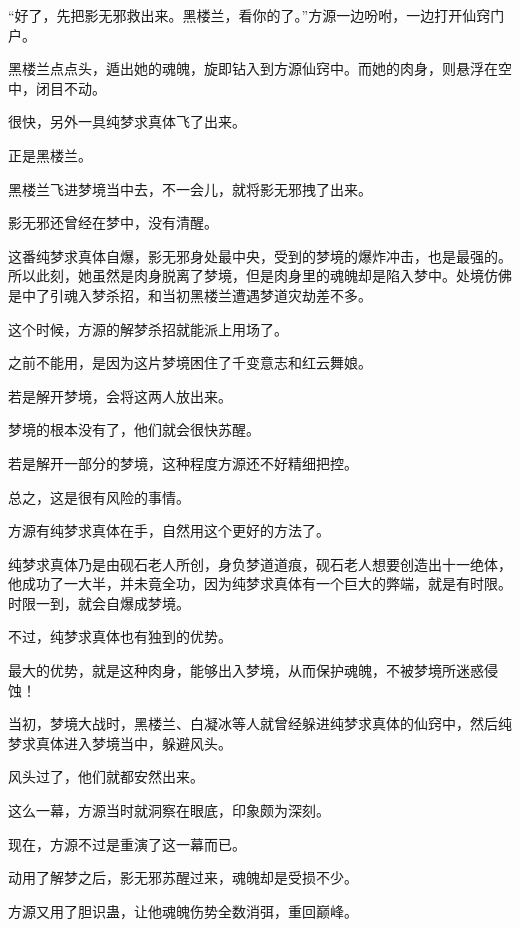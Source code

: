 
\begin{this_body}



“好了，先把影无邪救出来。黑楼兰，看你的了。”方源一边吩咐，一边打开仙窍门户。

黑楼兰点点头，遁出她的魂魄，旋即钻入到方源仙窍中。而她的肉身，则悬浮在空中，闭目不动。

很快，另外一具纯梦求真体飞了出来。

正是黑楼兰。

黑楼兰飞进梦境当中去，不一会儿，就将影无邪拽了出来。

影无邪还曾经在梦中，没有清醒。

这番纯梦求真体自爆，影无邪身处最中央，受到的梦境的爆炸冲击，也是最强的。所以此刻，她虽然是肉身脱离了梦境，但是肉身里的魂魄却是陷入梦中。处境仿佛是中了引魂入梦杀招，和当初黑楼兰遭遇梦道灾劫差不多。

这个时候，方源的解梦杀招就能派上用场了。

之前不能用，是因为这片梦境困住了千变意志和红云舞娘。

若是解开梦境，会将这两人放出来。

梦境的根本没有了，他们就会很快苏醒。

若是解开一部分的梦境，这种程度方源还不好精细把控。

总之，这是很有风险的事情。

方源有纯梦求真体在手，自然用这个更好的方法了。

纯梦求真体乃是由砚石老人所创，身负梦道道痕，砚石老人想要创造出十一绝体，他成功了一大半，并未竟全功，因为纯梦求真体有一个巨大的弊端，就是有时限。时限一到，就会自爆成梦境。

不过，纯梦求真体也有独到的优势。

最大的优势，就是这种肉身，能够出入梦境，从而保护魂魄，不被梦境所迷惑侵蚀！

当初，梦境大战时，黑楼兰、白凝冰等人就曾经躲进纯梦求真体的仙窍中，然后纯梦求真体进入梦境当中，躲避风头。

风头过了，他们就都安然出来。

这么一幕，方源当时就洞察在眼底，印象颇为深刻。

现在，方源不过是重演了这一幕而已。

动用了解梦之后，影无邪苏醒过来，魂魄却是受损不少。

方源又用了胆识蛊，让他魂魄伤势全数消弭，重回巅峰。


\end{this_body}
